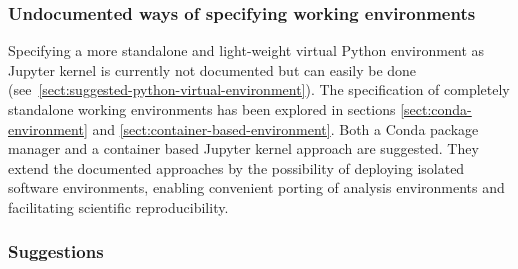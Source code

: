 \subsubsection{Undocumented ways of specifying working environments}

Specifying a more standalone and light-weight virtual Python environment as Jupyter kernel is currently not documented but can easily be done (see~\ref{sect:suggested-python-virtual-environment}).
The specification of completely standalone working environments has been explored in sections \ref{sect:conda-environment} and \ref{sect:container-based-environment}.
Both a Conda package manager and a container based Jupyter kernel approach are suggested.
They extend the documented approaches by the possibility of deploying isolated software environments, enabling convenient porting of analysis environments and facilitating scientific reproducibility.

\subsubsection{Suggestions}


